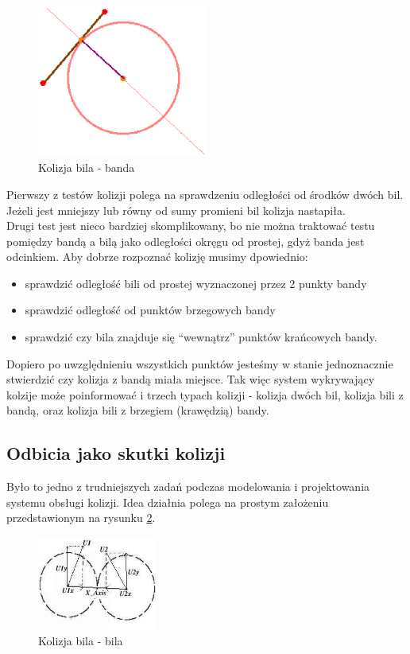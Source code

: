 \begin{figure}[h]
  \centering
  \includegraphics[width=0.5\textwidth]{./img/bbd_col.eps}
  \caption{Kolizja bila - banda}
  \label{fig:bbdcol}
\end{figure}

Pierwszy z testów kolizji polega na sprawdzeniu odległości od środków dwóch bil. Jeżeli jest mniejszy lub równy od sumy promieni bil kolizja nastapiła.\\
Drugi test jest nieco bardziej skomplikowany, bo nie można traktować testu pomiędzy bandą a bilą jako odległości okręgu od prostej, gdyż banda jest odcinkiem. Aby dobrze rozpoznać kolizję musimy dpowiednio:

\begin{itemize}
 \item sprawdzić odległość bili od prostej wyznaczonej przez 2 punkty bandy
 \item sprawdzić odległość od punktów brzegowych bandy
 \item sprawdzić czy bila znajduje się ``wewnątrz'' punktów krańcowych bandy.
\end{itemize}

Dopiero po uwzględnieniu wszystkich punktów jesteśmy w stanie jednoznacznie stwierdzić czy kolizja z bandą miała miejsce.
Tak więc system wykrywający kolzije może poinformować i trzech typach kolizji - kolizja dwóch bil, kolizja bili z bandą, 
oraz kolizja bili z brzegiem (krawędzią) bandy.


\subsection{Odbicia jako skutki kolizji}

Było to jedno z trudniejszych zadań podczas modelowania i projektowania systemu obsługi kolizji. Idea działnia
polega na prostym założeniu przedstawionym na rysunku \ref{fig:col}.

\begin{figure}[h]
  \centering
  \includegraphics[width=0.35\textwidth]{./img/col.eps}
  \caption{Kolizja bila - bila}
  \label{fig:col}
\end{figure}

